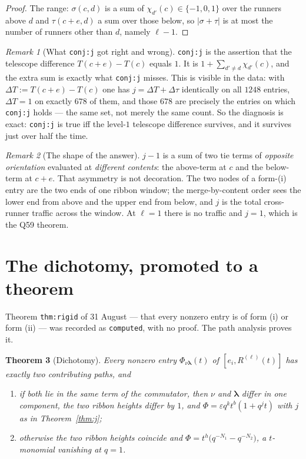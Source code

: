 \documentclass[11pt]{article}
\newtheorem{theorem}{Theorem}[section]
\theoremstyle{definition}
\theoremstyle{remark}
\newtheorem{remark}[theorem]{Remark}
\newcommand{\bl}{\boldsymbol{\lambda}}
\begin{document}
\begin{proof}
The range: $\sigma(c,d)$ is a sum of $\chi_{d'}(c)\in\{-1,0,1\}$ over the runners above
$d$ and $\tau(c+e,d)$ a sum over those below, so $|\sigma+\tau|$ is at most the number of
runners other than $d$, namely $\ell-1$.
\end{proof}

\begin{remark}[What \texttt{conj:j} got right and wrong]
\texttt{conj:j} is the assertion that the telescope difference $T(c+e)-T(c)$ equals $1$.
It is $1+\sum_{d'\ne d}\chi_{d'}(c)$, and the extra sum is exactly what \texttt{conj:j}
misses. This is visible in the data: with $\Delta T:=T(c+e)-T(c)$ one has
$j=\Delta T+\Delta\tau$ identically on all $1248$ entries, $\Delta T=1$ on exactly $678$
of them, and those $678$ are precisely the entries on which \texttt{conj:j} holds --- the
same set, not merely the same count. So the diagnosis is exact: \texttt{conj:j} is true
iff the level-$1$ telescope difference survives, and it survives just over half the time.
\end{remark}

\begin{remark}[The shape of the answer]
$j-1$ is a sum of two tie terms of \emph{opposite orientation} evaluated at
\emph{different contents}: the above-term at $c$ and the below-term at $c+e$. That
asymmetry is not decoration. The two nodes of a form-(i) entry are the two ends of one
ribbon window; the merge-by-content order sees the lower end from above and the upper end
from below, and $j$ is the total cross-runner traffic across the window. At $\ell=1$
there is no traffic and $j=1$, which is the Q59 theorem.
\end{remark}

\section{The dichotomy, promoted to a theorem}\label{sec:dichotomy}

Theorem \texttt{thm:rigid} of 31 August --- that every nonzero entry is of form (i) or
form (ii) --- was recorded as \texttt{computed}, with no proof. The path analysis proves
it.

\begin{theorem}[Dichotomy]\label{thm:dich}
Every nonzero entry $\Phi_{\nu\bl}(t)$ of $[e_i,R^{(\ell)}(t)]$ has exactly two
contributing paths, and
\begin{enumerate}
\item[(i)] if both lie in the same term of the commutator, then $\nu$ and $\bl$ differ in
one component, the two ribbon heights differ by $1$, and
$\Phi=\varepsilon q^{k}t^{b}(1+q^{j}t)$ with $j$ as in Theorem~\ref{thm:j};
\item[(ii)] otherwise the two ribbon heights coincide and
$\Phi=t^{h}\big(q^{-N_1}-q^{-N_2}\big)$, a $t$-monomial vanishing at $q=1$.
\end{enumerate}
\end{theorem}
\end{document}
